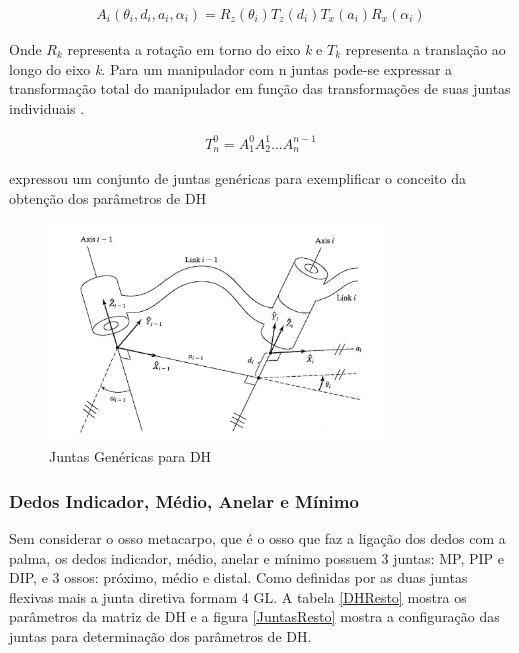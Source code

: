 \begin{align}
\label{RepDH}
A_i(\theta_i,d_i,a_i,\alpha_i) = R_z(\theta_i)T_z(d_i)T_x(a_i)R_x(\alpha_i)
\end{align}

Onde $R_k$ representa a rotação em torno do eixo \textit{k} e $T_k$ representa a translação ao longo do eixo \textit{k}. Para um manipulador com n juntas pode-se expressar a transformação total do manipulador em função das transformações de suas juntas individuais \cite{corke2007simple}.

\begin{align}
\label{TransDH}
T^{0}_n = A^{0}_1 A^{1}_2 ... A^{n-1}_n
\end{align}

\cite{craig2005introduction} expressou um conjunto de juntas genéricas para exemplificar o conceito da obtenção dos parâmetros de DH

\begin{figure}[H]
\centering
\includegraphics[width = 0.8\textwidth]{img/Craig_DHLinks.JPG}
\caption[Representação das Juntas para Obtenção dos Parâmetros de DH]{Juntas Genéricas para DH \cite{craig2005introduction}}
\label{Rocha2011}
\end{figure}

\subsubsection{Dedos Indicador, Médio, Anelar e Mínimo}
Sem considerar o osso metacarpo, que é o osso que faz a ligação dos dedos com a palma, os dedos indicador, médio, anelar e mínimo possuem 3 juntas: MP, PIP e DIP, e 3 ossos: próximo, médio e distal. Como definidas por \cite{lee1995model} as duas juntas flexivas mais a junta diretiva formam 4 GL. A tabela \ref{DHResto} mostra os parâmetros da matriz de DH e a figura \ref{JuntasResto} mostra a configuração das juntas para determinação dos parâmetros de DH.

